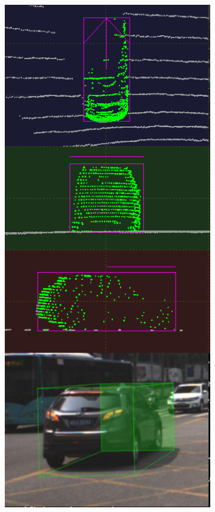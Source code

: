 \documentclass[letterpaper, 10 pt, conference]{ieeeconf}  %
\begin{document}
\begin{figure}[th]
\begin{subfigure}{0.16\linewidth}
		\includegraphics[scale=0.12]{./figures/transfer/car-3}
		\caption{}
	\end{subfigure}
	~
	\begin{subfigure}{0.16\linewidth}

\end{subfigure}
\end{figure}
\end{document}
